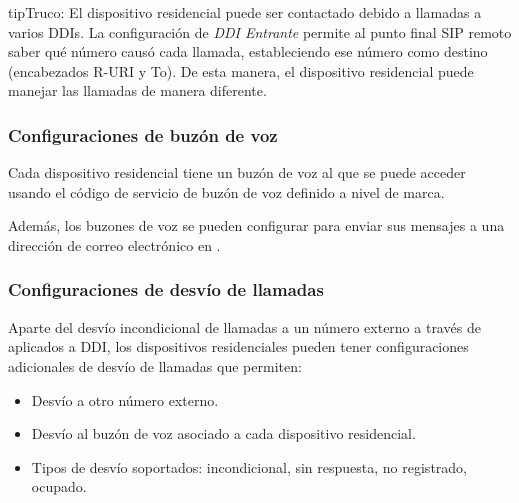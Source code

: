\documentclass[letterpaper,10pt,spanish]{sphinxmanual}
\begin{document}
\begin{notice}{tip}{Truco:}
El dispositivo residencial puede ser contactado debido a llamadas a varios DDIs. La configuración de \emph{DDI Entrante} permite al punto final SIP remoto saber qué número causó cada llamada, estableciendo ese número como destino (encabezados R-URI y To). De esta manera, el dispositivo residencial puede manejar las llamadas de manera diferente.
\end{notice}


\subsubsection{Configuraciones de buzón de voz}
\label{administration_portal/client/residential/residential_devices:voicemail-settings}
Cada dispositivo residencial tiene un buzón de voz al que se puede acceder usando el código de servicio de buzón de voz definido a nivel de marca.

Además, los buzones de voz se pueden configurar para enviar sus mensajes a una dirección de correo electrónico en {\hyperref[administration_portal/client/residential/residential_voicemails:residential\string-voicemails]{}}.


\subsubsection{Configuraciones de desvío de llamadas}
\label{administration_portal/client/residential/residential_devices:residential-devices-cfw}\label{administration_portal/client/residential/residential_devices:call-forwarding-settings}
Aparte del desvío incondicional de llamadas a un número externo a través de {\hyperref[administration_portal/client/vpbx/routing_tools/external_call_filters:external\string-call\string-filters]{}} aplicados a DDI, los dispositivos residenciales pueden tener configuraciones adicionales de desvío de llamadas que permiten:
\begin{itemize}
\item {} 
Desvío a otro número externo.

\item {} 
Desvío al buzón de voz asociado a cada dispositivo residencial.

\item {} 
Tipos de desvío soportados: incondicional, sin respuesta, no registrado, ocupado.

\end{itemize}
\end{document}
